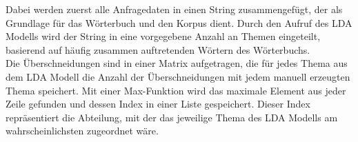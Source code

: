 \documentclass[german,version-2020-11]{uzl-thesis}
\begin{document}
Dabei werden zuerst alle Anfragedaten in einen String zusammengefügt, der als Grundlage für das Wörterbuch und den Korpus dient. Durch den Aufruf des LDA Modells wird der String in eine vorgegebene Anzahl an Themen eingeteilt, basierend auf häufig zusammen auftretenden Wörtern des Wörterbuchs. \\

Die Überschneidungen sind in einer Matrix aufgetragen, die für jedes Thema aus dem LDA Modell die Anzahl der Überschneidungen mit jedem manuell erzeugten Thema speichert. Mit einer Max-Funktion wird das maximale Element aus jeder Zeile gefunden und dessen Index in einer Liste gespeichert. Dieser Index repräsentiert die Abteilung, mit der das jeweilige Thema des LDA Modells am wahrscheinlichsten zugeordnet wäre.  \\
\end{document}

